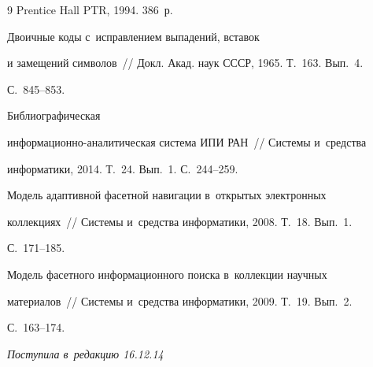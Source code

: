 {{{\begin{thebibliography}{9}
Prentice Hall PTR, 1994. 386~р.




 Двоичные коды с~исправлением выпадений, вставок


и замещений символов~/\!\!/ Докл. Акад. наук СССР, 1965. Т.~163. Вып.~4.


С.~845--853.




 Библиографическая


ин\-фор\-ма\-ци\-он\-но-аналитическая система ИПИ РАН~/\!\!/ Системы и~средства


информатики, 2014. Т.~24. Вып.~1. С.~244--259.






Модель адап\-тив\-ной фасетной навигации в~открытых электронных


коллекциях~/\!\!/ Системы и~средства информатики, 2008. Т.~18. Вып.~1.


С.~171--185.






Модель фасетного информационного поиска в~коллекции научных


материалов~/\!\!/ Системы и~средства информатики, 2009. Т.~19. Вып.~2.


С.~163--174.


\end{thebibliography}


} }








\vspace*{-3pt}





\hfill{\small\textit{Поступила в~редакцию 16.12.14}}














\vspace*{9pt}





}
